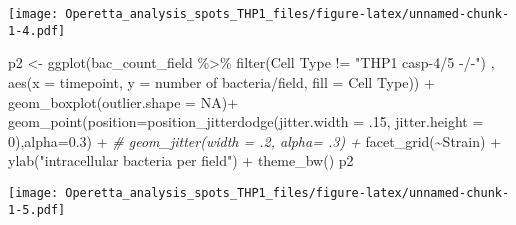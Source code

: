 \documentclass[
]{article}
\newenvironment{Shaded}{\begin{snugshade}}{\end{snugshade}}
\newcommand{\AttributeTok}[1]{\textcolor[rgb]{0.77,0.63,0.00}{#1}}
\newcommand{\CommentTok}[1]{\textcolor[rgb]{0.56,0.35,0.01}{\textit{#1}}}
\newcommand{\ConstantTok}[1]{\textcolor[rgb]{0.00,0.00,0.00}{#1}}
\newcommand{\DecValTok}[1]{\textcolor[rgb]{0.00,0.00,0.81}{#1}}
\newcommand{\FloatTok}[1]{\textcolor[rgb]{0.00,0.00,0.81}{#1}}
\newcommand{\FunctionTok}[1]{\textcolor[rgb]{0.00,0.00,0.00}{#1}}
\newcommand{\NormalTok}[1]{#1}
\newcommand{\OtherTok}[1]{\textcolor[rgb]{0.56,0.35,0.01}{#1}}
\newcommand{\SpecialCharTok}[1]{\textcolor[rgb]{0.00,0.00,0.00}{#1}}
\newcommand{\StringTok}[1]{\textcolor[rgb]{0.31,0.60,0.02}{#1}}
\begin{document}
\texttt{[image: Operetta\_analysis\_spots\_THP1\_files/figure-latex/unnamed-chunk-1-4.pdf]}

\begin{Shaded}
\begin{Highlighting}[]
\NormalTok{p2 }\OtherTok{\textless{}{-}} \FunctionTok{ggplot}\NormalTok{(bac\_count\_field }\SpecialCharTok{\%\textgreater{}\%}
               \FunctionTok{filter}\NormalTok{(}\StringTok{\textasciigrave{}}\AttributeTok{Cell Type}\StringTok{\textasciigrave{}} \SpecialCharTok{!=} \StringTok{"THP1 casp{-}4/5 {-}/{-}"}\NormalTok{)}
\NormalTok{             , }\FunctionTok{aes}\NormalTok{(}\AttributeTok{x =}\NormalTok{ timepoint, }\AttributeTok{y =} \StringTok{\textasciigrave{}}\AttributeTok{number of bacteria/field}\StringTok{\textasciigrave{}}\NormalTok{, }\AttributeTok{fill =} \StringTok{\textasciigrave{}}\AttributeTok{Cell Type}\StringTok{\textasciigrave{}}\NormalTok{)) }\SpecialCharTok{+}
  \FunctionTok{geom\_boxplot}\NormalTok{(}\AttributeTok{outlier.shape =} \ConstantTok{NA}\NormalTok{)}\SpecialCharTok{+}
  \FunctionTok{geom\_point}\NormalTok{(}\AttributeTok{position=}\FunctionTok{position\_jitterdodge}\NormalTok{(}\AttributeTok{jitter.width =}\NormalTok{ .}\DecValTok{15}\NormalTok{, }\AttributeTok{jitter.height =} \DecValTok{0}\NormalTok{),}\AttributeTok{alpha=}\FloatTok{0.3}\NormalTok{) }\SpecialCharTok{+}
  \CommentTok{\#  geom\_jitter(width = .2, alpha= .3) +}
  \FunctionTok{facet\_grid}\NormalTok{(}\SpecialCharTok{\textasciitilde{}}\NormalTok{Strain) }\SpecialCharTok{+}
  \FunctionTok{ylab}\NormalTok{(}\StringTok{"intracellular bacteria per field"}\NormalTok{) }\SpecialCharTok{+}
  \FunctionTok{theme\_bw}\NormalTok{()}
\NormalTok{p2}
\end{Highlighting}
\end{Shaded}

\texttt{[image: Operetta\_analysis\_spots\_THP1\_files/figure-latex/unnamed-chunk-1-5.pdf]}
\end{document}
